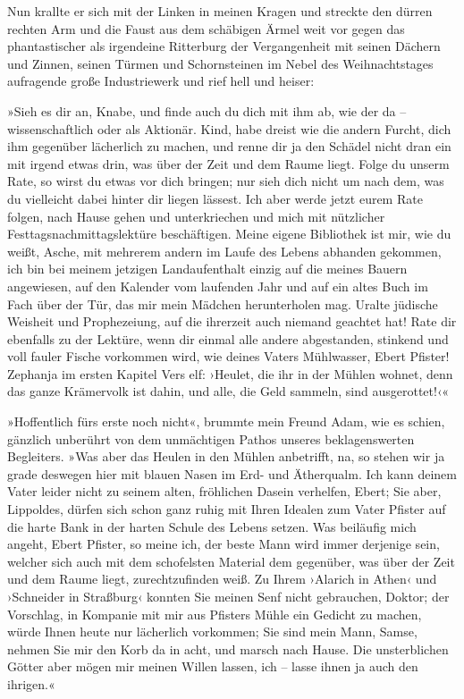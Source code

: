 Nun krallte er sich mit der Linken in meinen Kragen und streckte
den dürren rechten Arm und die Faust aus dem schäbigen Ärmel weit
vor gegen das phantastischer als irgendeine Ritterburg der
Vergangenheit mit seinen Dächern und Zinnen, seinen Türmen und
Schornsteinen im Nebel des Weihnachtstages aufragende große
Industriewerk und rief hell und heiser:

»Sieh es dir an, Knabe, und finde auch du dich mit ihm ab, wie der
da – wissenschaftlich oder als Aktionär. Kind, habe dreist wie die
andern Furcht, dich ihm gegenüber lächerlich zu machen, und renne
dir ja den Schädel nicht dran ein mit irgend etwas drin, was über
der Zeit und dem Raume liegt. Folge du unserm Rate, so wirst du
etwas vor dich bringen; nur sieh dich nicht um nach dem, was du
vielleicht dabei hinter dir liegen lässest. Ich aber werde jetzt
eurem Rate folgen, nach Hause gehen und unterkriechen und mich mit
nützlicher Festtagsnachmittagslektüre beschäftigen. Meine eigene
Bibliothek ist mir, wie du weißt, Asche, mit mehrerem andern im
Laufe des Lebens abhanden gekommen, ich bin bei meinem jetzigen
Landaufenthalt einzig auf die meines Bauern angewiesen, auf den
Kalender vom laufenden Jahr und auf ein altes Buch im Fach über der
Tür, das mir mein Mädchen herunterholen mag. Uralte jüdische
Weisheit und Prophezeiung, auf die ihrerzeit auch niemand geachtet
hat! Rate dir ebenfalls zu der Lektüre, wenn dir einmal alle andere
abgestanden, stinkend und voll fauler Fische vorkommen wird, wie
deines Vaters Mühlwasser, Ebert Pfister! Zephanja im ersten Kapitel
Vers elf: ›Heulet, die ihr in der Mühlen wohnet, denn das ganze
Krämervolk ist dahin, und alle, die Geld sammeln, sind
ausgerottet!‹«

»Hoffentlich fürs erste noch nicht«, brummte mein Freund Adam, wie
es schien, gänzlich unberührt von dem unmächtigen Pathos unseres
beklagenswerten Begleiters. »Was aber das Heulen in den Mühlen
anbetrifft, na, so stehen wir ja grade deswegen hier mit blauen
Nasen im Erd- und Ätherqualm. Ich kann deinem Vater leider nicht zu
seinem alten, fröhlichen Dasein verhelfen, Ebert; Sie aber,
Lippoldes, dürfen sich schon ganz ruhig mit Ihren Idealen zum Vater
Pfister auf die harte Bank in der harten Schule des Lebens setzen.
Was beiläufig mich angeht, Ebert Pfister, so meine ich, der beste
Mann wird immer derjenige sein, welcher sich auch mit dem
schofelsten Material dem gegenüber, was über der Zeit und dem Raume
liegt, zurechtzufinden weiß. Zu Ihrem ›Alarich in Athen‹ und
›Schneider in Straßburg‹ konnten Sie meinen Senf nicht gebrauchen,
Doktor; der Vorschlag, in Kompanie mit mir aus Pfisters Mühle ein
Gedicht zu machen, würde Ihnen heute nur lächerlich vorkommen; Sie
sind mein Mann, Samse, nehmen Sie mir den Korb da in acht, und
marsch nach Hause. Die unsterblichen Götter aber mögen mir meinen
Willen lassen, ich – lasse ihnen ja auch den ihrigen.«

